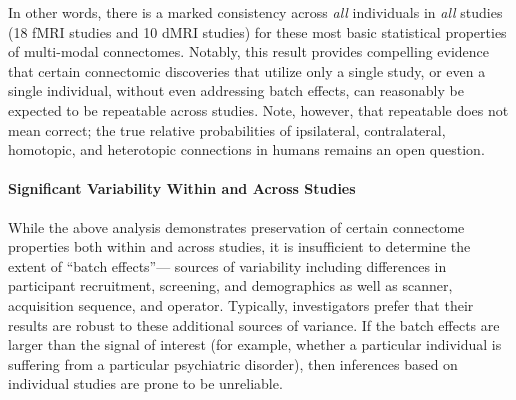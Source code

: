 \documentclass[11pt]{article}
\begin{document}
\begin{multicols}{2}
In other words, there is a marked consistency across \emph{all} individuals in \emph{all} studies (18 fMRI studies and 10 dMRI studies) for these most basic statistical properties of multi-modal connectomes. Notably, this result provides compelling evidence that certain connectomic discoveries that utilize only a single study, or even a single individual, without even addressing batch effects, can reasonably be expected to be repeatable across studies. Note, however, that repeatable does not mean correct; the true relative probabilities of ipsilateral, contralateral, homotopic, and heterotopic connections in humans remains an open question. 






\paragraph{Significant Variability Within and Across Studies}

While the above analysis demonstrates preservation of certain connectome properties both within and across studies, it is insufficient to determine the extent of ``batch effects''--- sources of variability including differences in participant recruitment, screening, and demographics as well as scanner, acquisition sequence, and operator.  Typically, investigators prefer that their results are robust to these additional sources of variance.
 If the batch effects are larger than the signal of interest (for example, whether a particular individual is suffering from a particular psychiatric disorder), then inferences based on individual studies are prone to be unreliable.  
%


\end{multicols}
\end{document}
